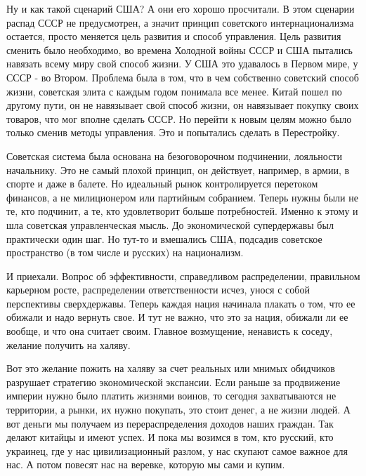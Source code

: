 Ну и как такой сценарий США? А они его хорошо просчитали. В этом сценарии
распад СССР не предусмотрен, а значит принцип советского интернационализма
остается, просто меняется цель развития и способ управления. Цель развития
сменить было необходимо, во времена Холодной войны СССР и США пытались навязать
всему миру свой способ жизни. У США это удавалось в Первом мире, у СССР - во
Втором.  Проблема была в том, что в чем собственно советский способ жизни,
советская элита с каждым годом понимала все менее. Китай пошел по другому пути,
он не навязывает свой способ жизни, он навязывает покупку своих товаров, что
мог вполне сделать СССР. Но перейти к новым целям можно было только сменив
методы управления. Это и попытались сделать в Перестройку. 

Советская система была основана на безоговорочном подчинении, лояльности
начальнику. Это не самый плохой принцип, он действует, например, в армии, в
спорте и даже в балете. Но идеальный рынок контролируется перетоком финансов, а
не милиционером или партийным собранием. Теперь нужны были не те, кто подчинит,
а те, кто удовлетворит больше потребностей. Именно к этому и шла советская
управленческая мысль. До экономической супердержавы был практически один шаг.
Но тут-то и вмешались США, подсадив советское пространство (в том числе и
русских) на национализм. 

И приехали. Вопрос об эффективности, справедливом распределении, правильном
карьерном росте, распределении ответственности исчез, унося с собой перспективы
сверхдержавы. Теперь каждая нация начинала плакать о том, что ее обижали и надо
вернуть свое. И тут не важно, что это за нация, обижали ли ее вообще, и что она
считает своим. Главное возмущение, ненависть к соседу, желание получить 
на халяву. 

Вот это желание пожить на халяву за счет реальных или мнимых обидчиков
разрушает стратегию экономической экспансии. Если раньше за продвижение империи
нужно было платить жизнями воинов, то сегодня захватываются не территории, а
рынки, их нужно покупать, это стоит денег, а не жизни людей. А вот деньги мы
получаем из перераспределения доходов наших граждан. Так делают китайцы и имеют
успех. И пока мы возимся в том, кто русский, кто украинец, где у нас
цивилизационный разлом, у нас скупают самое важное для нас. А потом повесят нас
на веревке, которую мы сами и купим.
